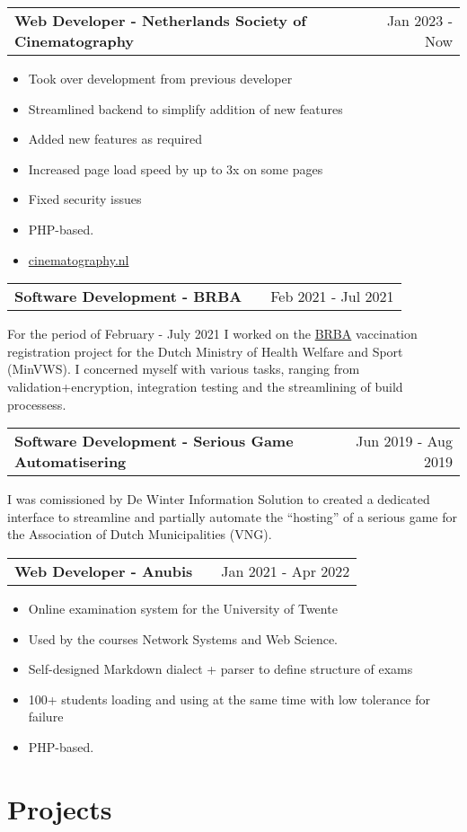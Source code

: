 \documentclass[a4paper,12pt]{article}
\makeatletter
\newenvironment{jobshort}[2]
    {
    \begin{tabularx}{\linewidth}{@{}l X r@{}}
    \textbf{#1} & \hfill &  #2 \\[3.75pt]
    \end{tabularx}
    }
    {
    }
\newenvironment{joblong}[2]
    {
    \begin{tabularx}{\linewidth}{@{}l X r@{}}
    \textbf{#1} & \hfill &  #2 \\[3.75pt]
    \end{tabularx}
    \begin{minipage}[t]{\linewidth}
    \begin{itemize}[nosep,after=\strut, leftmargin=1em, itemsep=3pt,label=--]
    }
    {
    \end{itemize}
    \end{minipage}    
    }
\makeatother
\begin{document}
\begin{joblong}{Web Developer - Netherlands Society of Cinematography}{Jan 2023 - Now}
\item Took over development from previous developer
\item Streamlined backend to simplify addition of new features
\item Added new features as required
\item Increased page load speed by up to 3x on some pages
\item Fixed security issues
\item PHP-based.
\item \href{https://cinematography.nl}{cinematography.nl}
\end{joblong}

\begin{jobshort}{Software Development - BRBA}{Feb 2021 - Jul 2021}
For the period of February - July 2021 I worked on the \href{https://www.ronroozendaal.nl/blog/2021/05/een-nieuw-registratiesysteem-in-een-paar-weken-tijd}{BRBA} vaccination registration project for the Dutch Ministry of Health Welfare and Sport (MinVWS). I concerned myself with various tasks, ranging from validation+encryption, integration testing and the streamlining of build processess.
\end{jobshort}

\begin{jobshort}{Software Development - Serious Game Automatisering}{Jun 2019 - Aug 2019}
I was comissioned by De Winter Information Solution to created a dedicated interface to streamline and partially automate the ``hosting'' of a serious game for the Association of Dutch Municipalities (VNG).
\end{jobshort}

\begin{joblong}{Web Developer - Anubis}{Jan 2021 - Apr 2022}
\item Online examination system for the University of Twente
\item Used by the courses Network Systems and Web Science.
\item Self-designed Markdown dialect + parser to define structure of exams 
\item 100+ students loading and using at the same time with low tolerance for failure
\item PHP-based.
\end{joblong}
  
\section{Projects}
\end{document}
